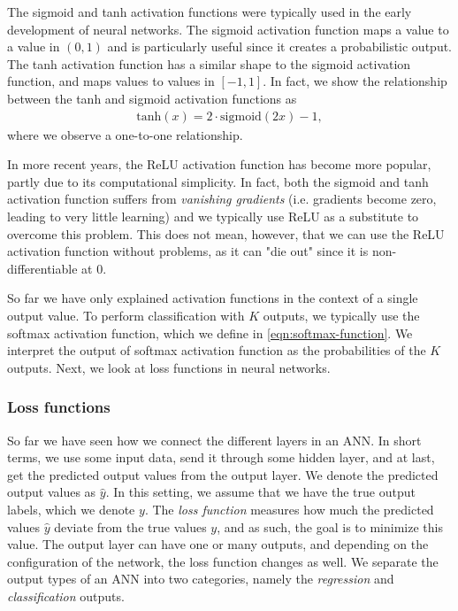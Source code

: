 The sigmoid and tanh activation functions were typically used in the early development of neural networks. The sigmoid activation function maps a value to a value in $(0, 1)$ and is particularly useful since it creates a probabilistic output. The tanh activation function has a similar shape to the sigmoid activation function, and maps values to values in $[-1, 1]$. In fact, we show the relationship between the tanh and sigmoid activation functions as
\begin{align}
    \label{eqn:tanh-sigmoid-relation}
    \text{tanh}(x) = 2 \cdot \text{sigmoid}(2x) - 1,
\end{align}
where we observe a one-to-one relationship.

In more recent years, the ReLU activation function has become more popular, partly due to its computational simplicity. In fact, both the sigmoid and tanh activation function suffers from \textit{vanishing gradients} (i.e. gradients become zero, leading to very little learning) and we typically use ReLU as a substitute to overcome this problem. This does not mean, however, that we can use the ReLU activation function without problems, as it can "die out" since it is non-differentiable at 0.

So far we have only explained activation functions in the context of a single output value. To perform classification with $K$ outputs, we typically use the softmax activation function, which we define in \cref{eqn:softmax-function}. We interpret the output of softmax activation function as the probabilities of the $K$ outputs. Next, we look at loss functions in neural networks.

\subsubsection{Loss functions}
\label{sec:ann-loss-functions}
So far we have seen how we connect the different layers in an ANN. In short terms, we use some input data, send it through some hidden layer, and at last, get the predicted output values from the output layer. We denote the predicted output values as $\hat{y}$. In this setting, we assume that we have the true output labels, which we denote $y$. The \textit{loss function} measures how much the predicted values $\hat{y}$ deviate from the true values $y$, and as such, the goal is to minimize this value. The output layer can have one or many outputs, and depending on the configuration of the network, the loss function changes as well. We separate the output types of an ANN into two categories, namely the \textit{regression} and \textit{classification} outputs.

